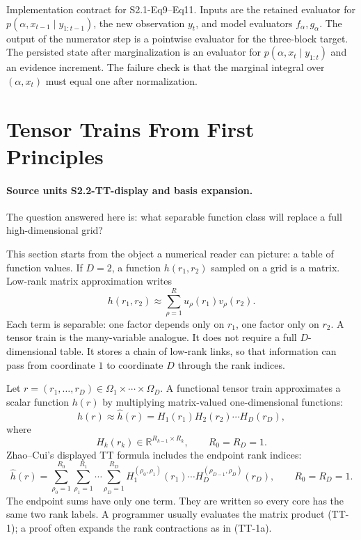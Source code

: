 \documentclass[11pt]{article}
\newcommand{\R}{\mathbb R}
\begin{document}
Implementation contract for S2.1-Eq9--Eq11.  Inputs are the retained evaluator
for \(p(\alpha,x_{t-1}\mid y_{1:t-1})\), the new observation \(y_t\), and model
evaluators \(f_\alpha,g_\alpha\).  The output of the numerator step is a
pointwise evaluator for the three-block target.  The persisted state after
marginalization is an evaluator for \(p(\alpha,x_t\mid y_{1:t})\) and an
evidence increment.  The failure check is that the marginal integral over
\((\alpha,x_t)\) must equal one after normalization.

\section{Tensor Trains From First Principles}

\paragraph{Source units S2.2-TT-display and basis expansion.}
The question answered here is: what separable function class will replace a
full high-dimensional grid?

This section starts from the object a numerical reader can picture: a table of
function values.  If \(D=2\), a function \(h(r_1,r_2)\) sampled on a grid is a
matrix.  Low-rank matrix approximation writes
\[
    h(r_1,r_2)\approx \sum_{\rho=1}^{R} u_\rho(r_1)v_\rho(r_2).
\]
Each term is separable: one factor depends only on \(r_1\), one factor only on
\(r_2\).  A tensor train is the many-variable analogue.  It does not require a
full \(D\)-dimensional table.  It stores a chain of low-rank links, so that
information can pass from coordinate \(1\) to coordinate \(D\) through the rank
indices.

Let \(r=(r_1,\ldots,r_D)\in\Omega_1\times\cdots\times\Omega_D\).  A functional
tensor train approximates a scalar function \(h(r)\) by multiplying
matrix-valued one-dimensional functions:
\[
    h(r)
    \approx
    \widehat h(r)
    =
    H_1(r_1)H_2(r_2)\cdots H_D(r_D),
    \tag{TT-1}
\]
where
\[
    H_k(r_k)\in \R^{R_{k-1}\times R_k},\qquad R_0=R_D=1.
\]
Zhao--Cui's displayed TT formula includes the endpoint rank indices:
\[
    \widehat h(r)
    =
    \sum_{\rho_0=1}^{R_0}\sum_{\rho_1=1}^{R_1}\cdots
    \sum_{\rho_D=1}^{R_D}
    H_1^{(\rho_0,\rho_1)}(r_1)\cdots
    H_D^{(\rho_{D-1},\rho_D)}(r_D),
    \qquad R_0=R_D=1.
    \tag{TT-1a}
\]
The endpoint sums have only one term.  They are written so every core has the
same two rank labels.  A programmer usually evaluates the matrix product
(TT-1); a proof often expands the rank contractions as in (TT-1a).
\end{document}
